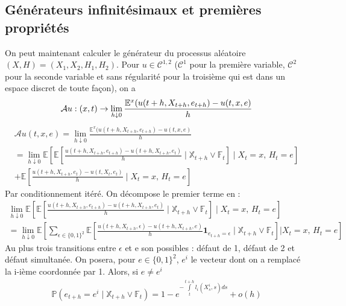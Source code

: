 \documentclass[a4paper]{article}
\begin{document}
\subsection{Générateurs infinitésimaux et premières propriétés}
On peut maintenant calculer le générateur du processus aléatoire $(X, H) = (X_{1}, X_{2}, H_{1}, H_{2})$. Pour $u \in \mathcal{C}^{1, 2}$ ($\mathcal{C}^{1}$ pour la première variable, $\mathcal{C}^{2}$ pour la seconde variable et sans régularité pour la troisième qui est dans un espace discret de toute façon), on a
\begin{equation*}
\mathcal{A}u : (x,t)
\rightarrow \space \lim_{h\downarrow 0} \frac {\mathbb{E}^{x}(u(t+h, X_{t+h}, e_{t+h}) - u(t,x,e)}{h}
\end{equation*}
\begin{multline*}
\mathcal{A}u(t,x,e) = \lim_{h\downarrow 0} \frac {\mathbb{E}^{x}(u(t+h, X_{t+h}, e_{t+h}) - u(t,x,e)}{h} \\
= \lim_{h\downarrow 0} \mathbb{E}\left[
\mathbb{E} \left[ \frac{u (t+h, X_{t+h}, e_{t+h}) - u(t+h, X_{t+h}, e_{t})}{h} \mid \mathbb{X}_{t+h} \vee \mathbb{F}_{t}  \right] \mid X_t = x, \, H_t = e \right] \\
 + \mathbb{E} \left[ \frac {u(t+h, X_{t+h}, e_{t}) -  u(t, X_{t}, e_{t})}{h} \mid X_t = x, \, H_t = e \right]
\end{multline*}
Par conditionnement itéré. On décompose le premier terme en :
\begin{multline*}
\lim_{h\downarrow 0} \mathbb{E} \left[
\mathbb{E} \left[ \frac{u (t+h, X_{t+h}, e_{t+h}) - u(t+h, X_{t+h}, e_{t})}{h} \mid \mathbb{X}_{t+h} \vee \mathbb{F}_{t}  \right] \mid X_t = x, \, H_t = e \right] \\
=  \lim_{h\downarrow 0} \mathbb{E} \left[ \sum \limits_{\epsilon \in \lbrace 0, 1 \rbrace^{2}} \mathbb{E} \left[ \frac{u (t+h, X_{t+h}, \epsilon) - u(t+h, X_{t+h}, e)}{h} \mathbf{1}_{e_{t+h} = \epsilon} \mid \mathbb{X}_{t+h} \vee \mathbb{F}_{t}  \right] \vert X_t = x, \, H_t = e \right]
\end{multline*}
Au plus trois transitions entre $\epsilon$ et e son possibles : défaut de 1, défaut de 2 et défaut simultanée. On posera, pour $e  \in \lbrace 0, 1 \rbrace^{2}$, $e^{i}$ le vecteur dont on a remplacé la i-ième coordonnée par 1. Alors, si $e \neq e^{i}$
\begin{eqnarray*}
\mathbb{P} \left(e_{t+h} = e^{i} \mid \mathbb{X}_{t+h} \vee \mathbb{F}_{t}  \right) = 1 - e^{ -\int \limits_{t}^{t+h} l_{i} (X^{i}_{s}, s)ds} + o(h)
\end{eqnarray*}
\end{document}

